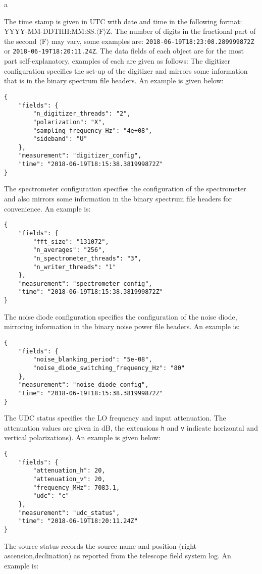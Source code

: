 a\documentclass[a4paper,14pt]{article}
\begin{document}
The time stamp is given in UTC with date and time in the following format: YYYY-MM-DDTHH:MM:SS.$\langle$F$\rangle$Z. The number of digits in the fractional part of the second $\langle$F$\rangle$ may vary, 
some examples are: \verb|2018-06-19T18:23:08.289999872Z| or \verb|2018-06-19T18:20:11.24Z|. The data fields of each object are for the most part self-explanatory, examples of each are given as follows:
The digitizer configuration specifies the set-up of the digitizer and mirrors some information that is in the binary spectrum file headers. An example is given below:
\begin{lstlisting}
{
    "fields": {
        "n_digitizer_threads": "2", 
        "polarization": "X", 
        "sampling_frequency_Hz": "4e+08", 
        "sideband": "U"
    }, 
    "measurement": "digitizer_config", 
    "time": "2018-06-19T18:15:38.381999872Z"
}
\end{lstlisting}
The spectrometer configuration specifies the configuration of the spectrometer and also mirrors some information in the binary spectrum file headers for convenience. An example is:
\begin{lstlisting}
{
    "fields": {
        "fft_size": "131072", 
        "n_averages": "256", 
        "n_spectrometer_threads": "3", 
        "n_writer_threads": "1"
    }, 
    "measurement": "spectrometer_config", 
    "time": "2018-06-19T18:15:38.381999872Z"
}
\end{lstlisting}
The noise diode configuration specifies the configuration of the noise diode, mirroring information in the binary noise power file headers. An example is:
\begin{lstlisting}
{
    "fields": {
        "noise_blanking_period": "5e-08", 
        "noise_diode_switching_frequency_Hz": "80"
    }, 
    "measurement": "noise_diode_config", 
    "time": "2018-06-19T18:15:38.381999872Z"
}
\end{lstlisting}
The UDC status specifies the LO frequency and input attenuation. The attenuation values are given in dB, the extensions \verb|h| and \verb|v| indicate horizontal and vertical polarizations). An example is given below:
\begin{lstlisting}
{
    "fields": {
        "attenuation_h": 20, 
        "attenuation_v": 20, 
        "frequency_MHz": 7083.1, 
        "udc": "c"
    }, 
    "measurement": "udc_status", 
    "time": "2018-06-19T18:20:11.24Z"
} 
\end{lstlisting}
The source status records the source name and position (right-ascension,declination) as reported from the telescope field system log. An example is:
\end{document}
